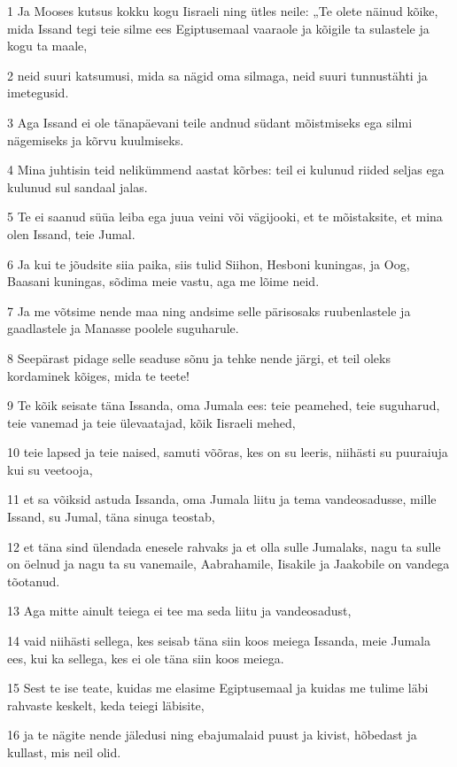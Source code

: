 \par 1 Ja Mooses kutsus kokku kogu Iisraeli ning ütles neile: „Te olete näinud kõike, mida Issand tegi teie silme ees Egiptusemaal vaaraole ja kõigile ta sulastele ja kogu ta maale,
\par 2 neid suuri katsumusi, mida sa nägid oma silmaga, neid suuri tunnustähti ja imetegusid.
\par 3 Aga Issand ei ole tänapäevani teile andnud südant mõistmiseks ega silmi nägemiseks ja kõrvu kuulmiseks.
\par 4 Mina juhtisin teid nelikümmend aastat kõrbes: teil ei kulunud riided seljas ega kulunud sul sandaal jalas.
\par 5 Te ei saanud süüa leiba ega juua veini või vägijooki, et te mõistaksite, et mina olen Issand, teie Jumal.
\par 6 Ja kui te jõudsite siia paika, siis tulid Siihon, Hesboni kuningas, ja Oog, Baasani kuningas, sõdima meie vastu, aga me lõime neid.
\par 7 Ja me võtsime nende maa ning andsime selle pärisosaks ruubenlastele ja gaadlastele ja Manasse poolele suguharule.
\par 8 Seepärast pidage selle seaduse sõnu ja tehke nende järgi, et teil oleks kordaminek kõiges, mida te teete!
\par 9 Te kõik seisate täna Issanda, oma Jumala ees: teie peamehed, teie suguharud, teie vanemad ja teie ülevaatajad, kõik Iisraeli mehed,
\par 10 teie lapsed ja teie naised, samuti võõras, kes on su leeris, niihästi su puuraiuja kui su veetooja,
\par 11 et sa võiksid astuda Issanda, oma Jumala liitu ja tema vandeosadusse, mille Issand, su Jumal, täna sinuga teostab,
\par 12 et täna sind ülendada enesele rahvaks ja et olla sulle Jumalaks, nagu ta sulle on öelnud ja nagu ta su vanemaile, Aabrahamile, Iisakile ja Jaakobile on vandega tõotanud.
\par 13 Aga mitte ainult teiega ei tee ma seda liitu ja vandeosadust,
\par 14 vaid niihästi sellega, kes seisab täna siin koos meiega Issanda, meie Jumala ees, kui ka sellega, kes ei ole täna siin koos meiega.
\par 15 Sest te ise teate, kuidas me elasime Egiptusemaal ja kuidas me tulime läbi rahvaste keskelt, keda teiegi läbisite,
\par 16 ja te nägite nende jäledusi ning ebajumalaid puust ja kivist, hõbedast ja kullast, mis neil olid.
